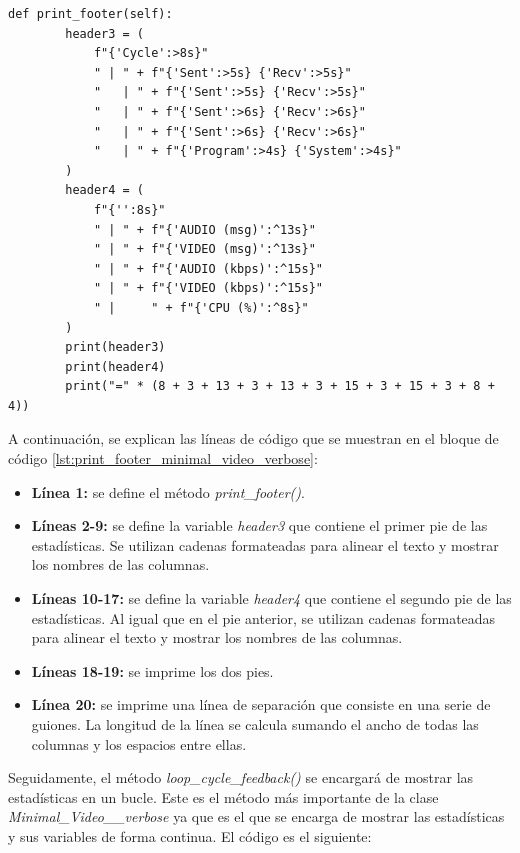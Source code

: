 \begin{lstlisting}[style=pythonstyle, caption={Método print\_footer() de \textit{Minimal\_Video\_verbose}}, label={lst:print_footer_minimal_video_verbose}]
def print_footer(self):
        header3 = (
            f"{'Cycle':>8s}"
            " | " + f"{'Sent':>5s} {'Recv':>5s}"
            "   | " + f"{'Sent':>5s} {'Recv':>5s}"
            "   | " + f"{'Sent':>6s} {'Recv':>6s}"
            "   | " + f"{'Sent':>6s} {'Recv':>6s}"
            "   | " + f"{'Program':>4s} {'System':>4s}"
        )
        header4 = (
            f"{'':8s}"
            " | " + f"{'AUDIO (msg)':^13s}"
            " | " + f"{'VIDEO (msg)':^13s}"
            " | " + f"{'AUDIO (kbps)':^15s}"
            " | " + f"{'VIDEO (kbps)':^15s}"
            " |     " + f"{'CPU (%)':^8s}"
        )
        print(header3)
        print(header4)
        print("=" * (8 + 3 + 13 + 3 + 13 + 3 + 15 + 3 + 15 + 3 + 8 + 4))
\end{lstlisting}
\vspace{\baselineskip}

A continuación, se explican las líneas de código que se muestran en el bloque de código \ref{lst:print_footer_minimal_video_verbose}:
\begin{itemize}
    \item \textbf{Línea 1:} se define el método \textit{print\_footer()}.
    \item \textbf{Líneas 2-9:} se define la variable \textit{header3} que contiene el primer pie de las estadísticas. Se utilizan cadenas formateadas para alinear el texto y mostrar los nombres de las columnas.
    \item \textbf{Líneas 10-17:} se define la variable \textit{header4} que contiene el segundo pie de las estadísticas. Al igual que en el pie anterior, se utilizan cadenas formateadas para alinear el texto y mostrar los nombres de las columnas.
    \item \textbf{Líneas 18-19:} se imprime los dos pies.
    \item \textbf{Línea 20:} se imprime una línea de separación que consiste en una serie de guiones. La longitud de la línea se calcula sumando el ancho de todas las columnas y los espacios entre ellas.
\end{itemize}
\vspace{\baselineskip}


Seguidamente, el método \textit{loop\_cycle\_feedback()} se encargará de mostrar las estadísticas en un bucle. Este es el método más importante de la clase \textit{Minimal\_Video\_\_verbose} ya que es el que se encarga de mostrar las estadísticas y sus variables de forma continua. El código es el siguiente:

